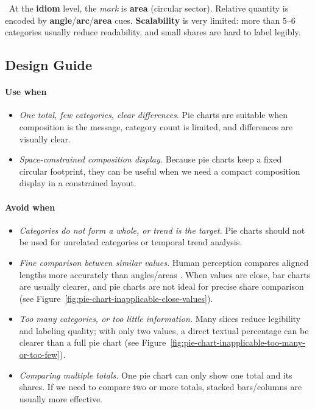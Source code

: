 \howpill\  At the \textbf{idiom} level, the \textit{mark} is \textbf{area} (circular sector). Relative quantity is encoded by \textbf{angle}/\textbf{arc}/\textbf{area} cues. \textbf{Scalability} is very limited: more than 5--6 categories usually reduce readability, and small shares are hard to label legibly.

\subsection*{Design Guide}
\paragraph{Use when}
\begin{itemize}
    \item \textit{One total, few categories, clear differences.} Pie charts are suitable when composition is the message, category count is limited, and differences are visually clear.
    \item \textit{Space-constrained composition display.} Because pie charts keep a fixed circular footprint, they can be useful when we need a compact composition display in a constrained layout.
\end{itemize}

\paragraph{Avoid when}
\begin{itemize}
    \item \textit{Categories do not form a whole, or trend is the target.} Pie charts should not be used for unrelated categories or temporal trend analysis.
    \item \textit{Fine comparison between similar values.} Human perception compares aligned lengths more accurately than angles/areas \parencite{heer2010}. When values are close, bar charts are usually clearer, and pie charts are not ideal for precise share comparison (see Figure~\ref{fig:pie-chart-inapplicable-close-values}).
    \item \textit{Too many categories, or too little information.} Many slices reduce legibility and labeling quality; with only two values, a direct textual percentage can be clearer than a full pie chart (see Figure~\ref{fig:pie-chart-inapplicable-too-many-or-too-few}).
    \item \textit{Comparing multiple totals.} One pie chart can only show one total and its shares. If we need to compare two or more totals, stacked bars/columns are usually more effective.
\end{itemize}

